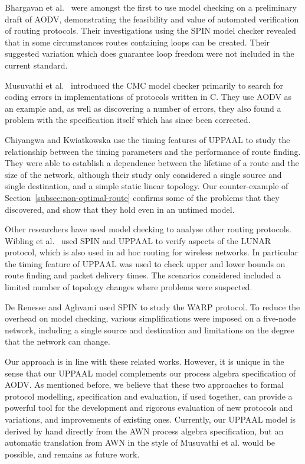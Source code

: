 \documentclass[conference,twoside]{IEEEtran}
\newcommand{\awn}{AWN\xspace}
\begin{document}
Bhargavan et al.\ \cite{BOG02} were amongst the first to use model checking on a preliminary draft of AODV, demonstrating the feasibility and value of automated verification of routing protocols. Their investigations using the SPIN model checker revealed that in some circumstances routes containing loops can be created. Their suggested variation which does guarantee loop freedom were not included in the current standard.

Musuvathi et al.\ \cite{MPCED02}  introduced the CMC  model checker
primarily to search for coding errors in implementations of protocols
written in C\@. They use AODV as an example and, as well as discovering
a number of errors, they also found a problem with the specification
itself which has since been corrected.

 Chiyangwa and Kwiatkowska \cite{CK05} use the timing features of
 UPPAAL to study the relationship between the timing parameters and
 the performance of route finding. They were able to establish  a
 dependence between the lifetime of a route and the size of the network, although their study only considered a  single source and single destination, and a simple static linear topology. Our counter-example of Section~\ref{subsec:non-optimal-route} confirms some of the problems that they discovered, and show that they hold even in an untimed model.

 Other researchers have used model checking to analyse other routing protocols. Wibling et al.\ \cite{WPP04} used  SPIN and UPPAAL to verify aspects of the LUNAR protocol, which is also used in ad hoc routing for wireless networks. In particular the timing feature of UPPAAL was used to check upper and lower bounds on route finding and packet delivery times. The scenarios considered included a limited number of topology changes where problems were suspected.

De Renesse and Aghvami \cite{RA04} used SPIN  to study the WARP protocol.  To reduce the overhead on model checking, various simplifications were imposed on a five-node network, including a single source and destination and limitations on the degree that the network can change.

Our approach is in line with these related works.
However, it is unique in the sense that our UPPAAL model complements
our process algebra specification of AODV. As mentioned before, we believe that these two approaches to formal protocol modelling, specification and evaluation, if used together,
can provide a powerful tool for the development and rigorous evaluation of new protocols and variations, and improvements of existing ones.
Currently, our UPPAAL model is derived by hand directly from the \awn process algebra specification, but an automatic translation from \awn in the style of
Musuvathi et al. \cite{MPCED02} would be possible, and remains as future work.
\end{document}
